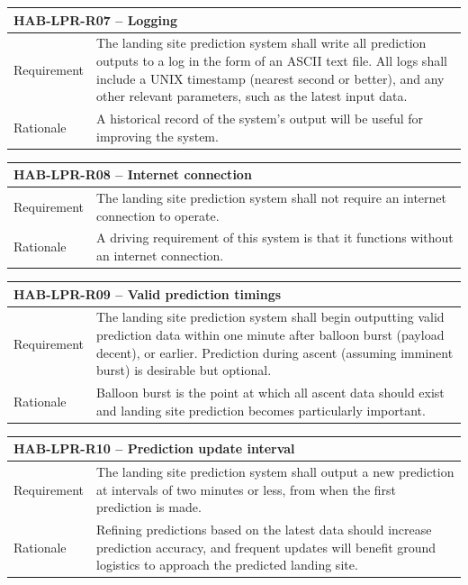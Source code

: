 \documentclass[11pt]{article}
\begin{document}
\begin{table}[!h] \centering
 \begin{tabular}{|p{2cm} p{11cm}|}
 \hline
  \multicolumn{2}{|l|}{HAB-LPR-R07 – Logging} \\
  \hline
  Requirement & The landing site prediction system shall write all prediction outputs to a log in the form of an ASCII text file. All logs shall include a UNIX timestamp (nearest second or better), and any other relevant parameters, such as the latest input data.  \\
  \hline
  Rationale & A historical record of the system’s output will be useful for improving the system.   \\
  \hline
 \end{tabular}
\end{table}

\begin{table}[!h] \centering
 \begin{tabular}{|p{2cm} p{11cm}|}
 \hline
  \multicolumn{2}{|l|}{HAB-LPR-R08 – Internet connection} \\
  \hline
  Requirement & The landing site prediction system shall not require an internet connection to operate. \\
  \hline
  Rationale & A driving requirement of this system is that it functions without an internet connection.  \\
  \hline
 \end{tabular}
\end{table}

\begin{table}[!h] \centering
 \begin{tabular}{|p{2cm} p{11cm}|}
 \hline
  \multicolumn{2}{|l|}{HAB-LPR-R09 – Valid prediction timings} \\
  \hline
  Requirement & The landing site prediction system shall begin outputting valid prediction data within one minute after balloon burst (payload decent), or earlier. Prediction during ascent (assuming imminent burst) is desirable but optional. \\
  \hline
  Rationale & Balloon burst is the point at which all ascent data should exist and landing site prediction becomes particularly important.   \\
  \hline
 \end{tabular}
\end{table}

\begin{table}[!h] \centering
 \begin{tabular}{|p{2cm} p{11cm}|}
 \hline
  \multicolumn{2}{|l|}{HAB-LPR-R10 – Prediction update interval} \\
  \hline
  Requirement & The landing site prediction system shall output a new prediction at intervals of two minutes or less, from when the first prediction is made. \\
  \hline
  Rationale & Refining predictions based on the latest data should increase prediction accuracy, and frequent updates will benefit ground logistics to approach the predicted landing site.  \\
  \hline
 \end{tabular}
\end{table}
\end{document}

